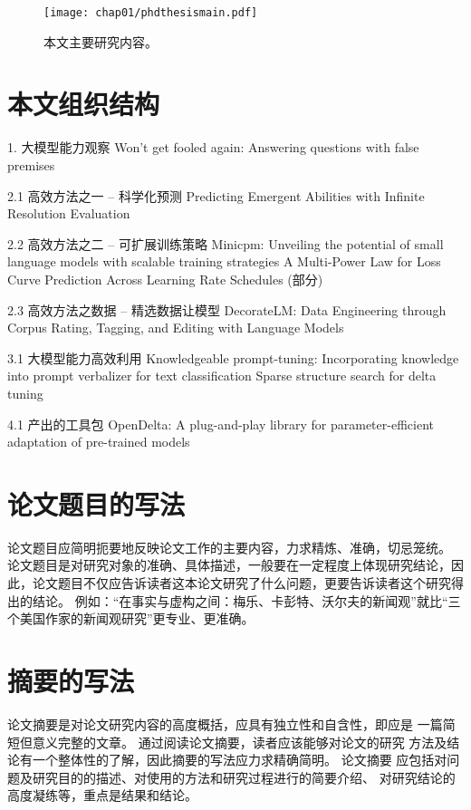 \begin{figure}
\centering
\texttt{[image: chap01/phdthesismain.pdf]}
\label{fig:mainframework}
\caption{本文主要研究内容。}
\end{figure}

\section{本文组织结构}


1. 大模型能力观察
Won't get fooled again: Answering questions with false premises

2.1 高效方法之一 -- 科学化预测
Predicting Emergent Abilities with Infinite Resolution Evaluation

2.2 高效方法之二 -- 可扩展训练策略
Minicpm: Unveiling the potential of small language models with scalable training strategies
A Multi-Power Law for Loss Curve Prediction Across Learning Rate Schedules (部分)

2.3 高效方法之数据 -- 精选数据让模型
DecorateLM: Data Engineering through Corpus Rating, Tagging, and Editing with Language Models


3.1 大模型能力高效利用
Knowledgeable prompt-tuning: Incorporating knowledge into prompt verbalizer for text classification
Sparse structure search for delta tuning

4.1 产出的工具包
OpenDelta: A plug-and-play library for parameter-efficient adaptation of pre-trained models


\section{论文题目的写法}

论文题目应简明扼要地反映论文工作的主要内容，力求精炼、准确，切忌笼统。
论文题目是对研究对象的准确、具体描述，一般要在一定程度上体现研究结论，因此，论文题目不仅应告诉读者这本论文研究了什么问题，更要告诉读者这个研究得出的结论。
例如：“在事实与虚构之间：梅乐、卡彭特、沃尔夫的新闻观”就比“三个美国作家的新闻观研究”更专业、更准确。



\section{摘要的写法}

论文摘要是对论文研究内容的高度概括，应具有独立性和自含性，即应是 一篇简短但意义完整的文章。
通过阅读论文摘要，读者应该能够对论文的研究 方法及结论有一个整体性的了解，因此摘要的写法应力求精确简明。
论文摘要 应包括对问题及研究目的的描述、对使用的方法和研究过程进行的简要介绍、 对研究结论的高度凝练等，重点是结果和结论。

